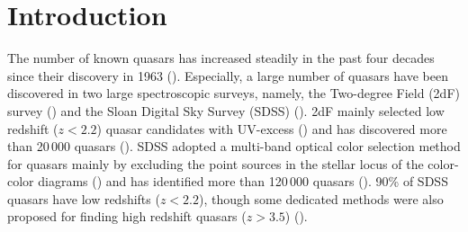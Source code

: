 \documentclass[referee]{raa}
\begin{document}
   \maketitle


%
\section{Introduction}           %
\label{sect:intro}

The number of known quasars has increased steadily in the past four decades since their discovery  in
 1963 (\citealt{Schmidt+1963}). Especially, a large number of quasars have
been discovered in two large spectroscopic surveys, namely, the Two-degree
Field (2dF) survey (\citealt{Boyle+etal+2000}) and the Sloan Digital Sky Survey (SDSS)
(\citealt{York+etal+2000}). 2dF mainly selected low redshift ($z<2.2$) quasar candidates with UV-excess
(\citealt{Smith+etal+2005}) and has discovered more than 20\,000 quasars (\citealt{Croom+etal+2004}).  SDSS adopted
a multi-band optical color selection method for quasars mainly by
excluding the point sources in the stellar locus of the color-color
diagrams (\citealt{Richards+etal+2002}) and has identified more
than 120\,000 quasars (\citealt{Schneider+etal+2010}).
90\% of SDSS quasars have low
redshifts ($z<2.2$), though some
dedicated methods were also proposed for finding high redshift quasars ($z>3.5$)
(\citealt{Fan+etal+2001a, Fan+etal+2001b, Richards+etal+2002}).
\end{document}
